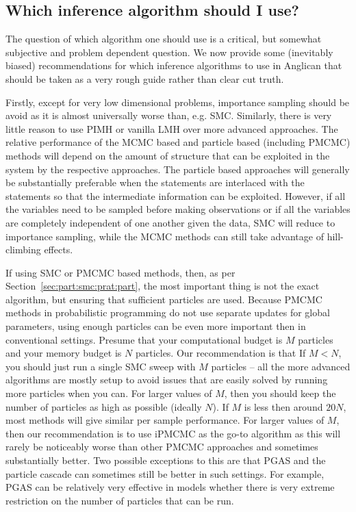 \subsection{Which inference algorithm should I use?}
\label{sec:proginf:str:which}

The question of which algorithm one should use is a critical, but somewhat subjective and
problem dependent question.  We now provide some (inevitably biased) recommendations for which
inference algorithms to use in Anglican that should be taken as a very rough guide rather than clear cut truth.

Firstly, except for very low dimensional problems, importance sampling should
be avoid as it is almost universally worse than, e.g. SMC.  Similarly, there is very little reason to use PIMH
or vanilla LMH over more advanced approaches.  The relative performance of the MCMC
based and particle based (including PMCMC) methods will depend on the amount of structure that can
be exploited in the system by the respective approaches.  The particle based approaches will generally be substantially
preferable when the \observe statements are interlaced with the \sample statements so that the intermediate
information can be exploited.  However, if all the variables need to be sampled before making observations or if
all the variables are completely independent of one another given the data, SMC will reduce to importance sampling,
while the MCMC methods can still take advantage of hill-climbing effects.

If using SMC or PMCMC based methods, then, as per Section~\ref{sec:part:smc:prat:part}, the most important
thing is not the exact algorithm, but ensuring that sufficient particles are used.  Because PMCMC methods
in probabilistic programming do not use separate updates for global parameters, using enough particles
can be even more important then in conventional settings.  Presume that your computational budget is $M$
particles and your memory budget is $N$ particles.  Our recommendation is that If $M<N$, you should
just run a single SMC sweep with $M$ particles -- all the more advanced algorithms are mostly setup to avoid
issues that are easily solved by running more particles when you can.  For larger values of $M$, then you should
keep the number of particles as high as possible (ideally $N$).  If $M$ is less then around $20 N$, most methods
will give similar per sample performance.  For larger values of $M$, then our recommendation is to use iPMCMC
as the go-to algorithm as this will rarely be noticeably worse than other PMCMC approaches and sometimes
substantially better.  Two possible exceptions to this are that PGAS and the particle cascade can sometimes still be better
in such settings.  For example, PGAS can be relatively very effective in models whether there is very extreme restriction on
the number of particles that can be run.